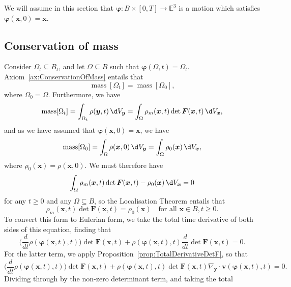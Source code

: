 \documentclass[
  letterpaper,
  DIV=11,
  numbers=noendperiod]{scrreprt}
\theoremstyle{plain}
\theoremstyle{remark}
\begin{document}
We will assume in this section that
\({\boldsymbol{\varphi}}:B\times[0,T]\to{\mathbb{E}}^3\) is a motion
which satisfies
\({\boldsymbol{\varphi}}({\boldsymbol{x}},0) = {\boldsymbol{x}}\).

\subsection{Conservation of mass}\label{sec:EulerianMass}

Consider \(\Omega_t\subseteq B_t\), and let \(\Omega\subseteq B\) such
that \({\boldsymbol{\varphi}}(\Omega,t) = \Omega_t\).
Axiom~\hyperref[ax:ConservationOfMass]{{[}ax:ConservationOfMass{]}}
entails that
\[{\operatorname{mass}}[\Omega_t] = {\operatorname{mass}}[\Omega_0],\]
where \(\Omega_0 = \Omega\). Furthermore, we have
\[{\operatorname{mass}}[\Omega_t] = \int_{\Omega_t}\rho({\boldsymbol{y}},t){\,\d V_{{\boldsymbol{y}}}}= \int_\Omega \rho_m({\boldsymbol{x}},t)\det{\boldsymbol{F}}({\boldsymbol{x}},t){\,\d V_{{\boldsymbol{x}}}},\]
and as we have assumed that
\({\boldsymbol{\varphi}}({\boldsymbol{x}},0) ={\boldsymbol{x}}\), we
have
\[{\operatorname{mass}}[\Omega_0] = \int_{\Omega}\rho({\boldsymbol{x}},0){\,\d V_{{\boldsymbol{y}}}}= \int_\Omega \rho_0({\boldsymbol{x}}){\,\d V_{{\boldsymbol{x}}}},\]
where \(\rho_0({\boldsymbol{x}}) =\rho({\boldsymbol{x}},0)\). We must
therefore have
\[\int_\Omega \rho_m({\boldsymbol{x}},t)\det{\boldsymbol{F}}({\boldsymbol{x}},t)-\rho_0({\boldsymbol{x}}){\,\d V_{{\boldsymbol{x}}}}=0\]
for any \(t\geq0\) and any \(\Omega\subseteq B\), so the Localisation
Theorem entails that \[\label{eq:ConsOfMass1}
  \rho_m({\boldsymbol{x}},t)\det{\boldsymbol{F}}({\boldsymbol{x}},t) = \rho_0({\boldsymbol{x}})\quad\text{for all }{\boldsymbol{x}}\in B, t\geq0.\]
To convert this form to Eulerian form, we take the total time derivative
of both sides of this equation, finding that
\[\bigg(\frac{d}{dt}\rho({\boldsymbol{\varphi}}({\boldsymbol{x}},t),t)\bigg)\det{\boldsymbol{F}}({\boldsymbol{x}},t)+\rho({\boldsymbol{\varphi}}({\boldsymbol{x}},t),t)\frac{d}{d t}\det{\boldsymbol{F}}({\boldsymbol{x}},t) = 0.\]
For the latter term, we apply
Proposition~\hyperref[prop:TotalDerivativeDetF]{{[}prop:TotalDerivativeDetF{]}},
so that
\[\bigg(\frac{d}{dt}\rho({\boldsymbol{\varphi}}({\boldsymbol{x}},t),t)\bigg)\det{\boldsymbol{F}}({\boldsymbol{x}},t)+\rho({\boldsymbol{\varphi}}({\boldsymbol{x}},t),t)\det{\boldsymbol{F}}({\boldsymbol{x}},t)\nabla_{\boldsymbol{y}}\cdot{\boldsymbol{v}}({\boldsymbol{\varphi}}({\boldsymbol{x}},t),t) = 0.\]
Dividing through by the non-zero determinant term, and taking the total
\end{document}
